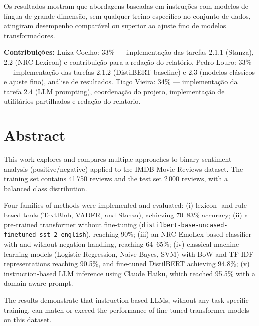 \documentclass[12pt,reqno,twoside]{amsbook}
\theoremstyle{plain}
\numberwithin{equation}{chapter}
\numberwithin{section}{chapter}
\begin{document}
Os resultados mostram que abordagens baseadas em instru\c{c}\~{o}es com modelos de
l\'{i}ngua de grande dimens\~{a}o, sem qualquer treino espec\'{i}fico no conjunto de
dados, atingiram desempenho compar\'{a}vel ou superior ao ajuste fino de modelos
transformadores.

\medskip\noindent\textbf{Contribui\c{c}\~{o}es:}
Luiza Coelho: 33\% --- implementa\c{c}\~{a}o das tarefas 2.1.1 (Stanza), 2.2 (NRC
Lexicon) e contribui\c{c}\~{a}o para a reda\c{c}\~{a}o do relat\'{o}rio.
Pedro Louro: 33\% --- implementa\c{c}\~{a}o das tarefas 2.1.2 (DistilBERT baseline)
e 2.3 (modelos cl\'{a}ssicos e ajuste fino), an\'{a}lise de resultados.
Tiago Vieira: 34\% --- implementa\c{c}\~{a}o da tarefa 2.4 (LLM prompting),
coordena\c{c}\~{a}o do projeto, implementa\c{c}\~{a}o de utilit\'{a}rios partilhados
e reda\c{c}\~{a}o do relat\'{o}rio.

\chapter*{Abstract}

\noindent This work explores and compares multiple approaches to binary sentiment
analysis (positive/negative) applied to the IMDB Movie Reviews dataset.
The training set contains 41\,750 reviews and the test set 2\,000 reviews,
with a balanced class distribution.

Four families of methods were implemented and evaluated:
(i) lexicon- and rule-based tools (TextBlob, VADER, and Stanza), achieving
70--83\% accuracy;
(ii) a pre-trained transformer without fine-tuning
(\texttt{distilbert-base-uncased-finetuned-sst-2-english}), reaching 90\%;
(iii) an NRC EmoLex-based classifier with and without negation handling, reaching
64--65\%;
(iv) classical machine learning models (Logistic Regression, Naive Bayes, SVM)
with BoW and TF-IDF representations reaching 90.5\%, and fine-tuned DistilBERT
achieving 94.8\%;
(v) instruction-based LLM inference using Claude Haiku, which reached 95.5\%
with a domain-aware prompt.

The results demonstrate that instruction-based LLMs, without any task-specific
training, can match or exceed the performance of fine-tuned transformer models
on this dataset.

\tableofcontents

\mainmatter
{}

\setcounter{page}{1}
\end{document}
